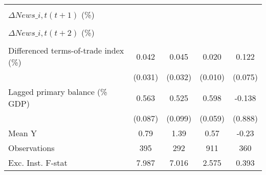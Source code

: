 {\begin{tabular}{l*{4}{c}}
                    &                     &                     &                     &                     \\
\addlinespace
$ \Delta News\_{i,t}(t+1)$ (\%)&                     &                     &                     &                     \\
                    &                     &                     &                     &                     \\
\addlinespace
$ \Delta News\_{i,t}(t+2)$ (\%)&                     &                     &                     &                     \\
                    &                     &                     &                     &                     \\
\addlinespace
Differenced terms-of-trade index (\%)&       0.042         &       0.045         &       0.020\sym{**} &       0.122         \\
                    &     (0.031)         &     (0.032)         &     (0.010)         &     (0.075)         \\
\addlinespace
Lagged primary balance (\% GDP)&       0.563\sym{***}&       0.525\sym{***}&       0.598\sym{***}&      -0.138         \\
                    &     (0.087)         &     (0.099)         &     (0.059)         &     (0.888)         \\
\midrule
Mean Y              &        0.79         &        1.39         &        0.57         &       -0.23         \\
Observations        &         395         &         292         &         911         &         360         \\
Exc. Inst. F-stat   &       7.987         &       7.016         &       2.575         &       0.393         \\
\bottomrule
\end{tabular}
}
